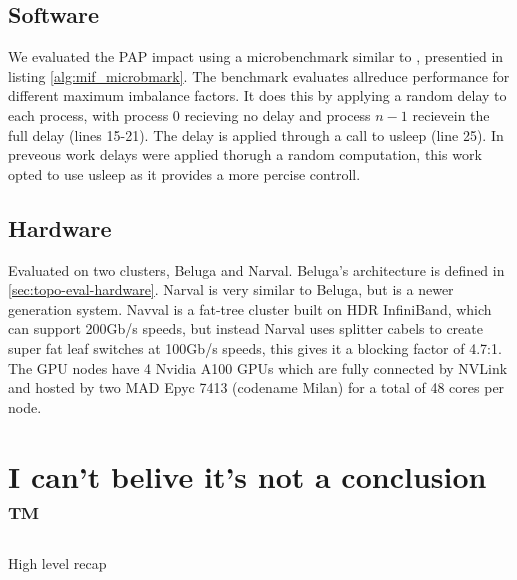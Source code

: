 


\subsection{Software}
We evaluated the PAP impact using a microbenchmark similar to \cite{Faraj2008StudyProcArrivalMPIColl}, presentied in listing \ref{alg:mif_microbmark}.
The benchmark evaluates allreduce performance for different maximum imbalance factors. 
It does this by applying a random delay to each process, with process 0 recieving no delay and process $n-1$ recievein the full delay (lines 15-21).
The delay is applied through a call to usleep (line 25).
In preveous work \cite{Faraj2008StudyProcArrivalMPIColl, Alizadeh2022PAPCollDL} delays were applied thorugh a random computation, this work opted to use usleep as it provides a more percise controll.



\subsection{Hardware}
Evaluated on two clusters, Beluga and Narval.
Beluga's architecture is defined in \ref{sec:topo-eval-hardware}.
Narval is very similar to Beluga, but is a newer generation system.
Navval is a fat-tree cluster built on HDR InfiniBand, which can support 200Gb/s speeds, but instead Narval uses splitter cabels to create super fat leaf switches at 100Gb/s speeds, this gives it a blocking factor of 4.7:1.
The GPU nodes have 4 Nvidia A100 GPUs which are fully connected by NVLink and hosted by two MAD Epyc 7413 (codename Milan) for a total of 48 cores per node.





% 

\section{I can't belive it's not a conclusion ™}
High level recap

